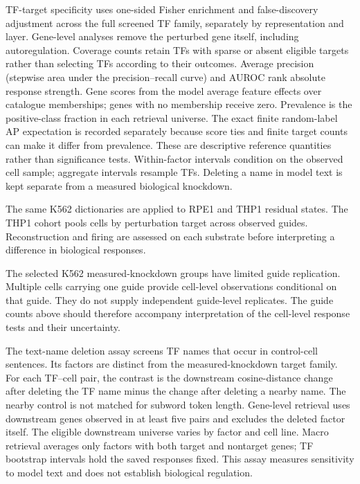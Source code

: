 \documentclass[11pt]{article}
\begin{document}
TF-target specificity uses one-sided Fisher enrichment and false-discovery adjustment across
the full screened TF family, separately by representation and layer. Gene-level analyses remove
the perturbed gene itself, including autoregulation. Coverage counts retain TFs with sparse or
absent eligible targets rather than selecting TFs according to their outcomes. Average precision
(stepwise area under the precision--recall curve) and AUROC rank absolute response strength.
Gene scores from the model average feature effects over catalogue memberships; genes with no
membership receive zero. Prevalence is the positive-class fraction in each retrieval universe.
The exact finite random-label AP expectation is recorded separately because score ties and
finite target counts can make it differ from prevalence. These are descriptive reference
quantities rather than significance tests.
Within-factor intervals condition on the observed cell sample; aggregate intervals resample TFs.
Deleting a name in model text is kept separate from a measured biological knockdown.

The same K562 dictionaries are applied to RPE1 and THP1 residual states. The THP1 cohort pools
cells by perturbation target across observed guides. Reconstruction and firing are assessed on
each substrate before interpreting a difference in biological responses.





The selected K562 measured-knockdown groups have limited guide replication. Multiple cells
carrying one guide provide cell-level observations conditional on that guide. They do not supply
independent guide-level replicates. The guide counts above should therefore accompany
interpretation of the cell-level response tests and their uncertainty.

The text-name deletion assay screens TF names that occur in control-cell sentences. Its factors
are distinct from the measured-knockdown target family. For each TF--cell pair, the contrast is
the downstream cosine-distance change after deleting the TF name minus the change after deleting
a nearby name. The nearby control is not matched for subword token length. Gene-level retrieval
uses downstream genes observed in at least five pairs and excludes the deleted factor itself.
The eligible downstream universe varies by factor and cell line. Macro retrieval averages only
factors with both target and nontarget genes; TF bootstrap intervals hold the saved responses fixed.
This assay measures sensitivity to model text and does not establish biological regulation.
\end{document}
